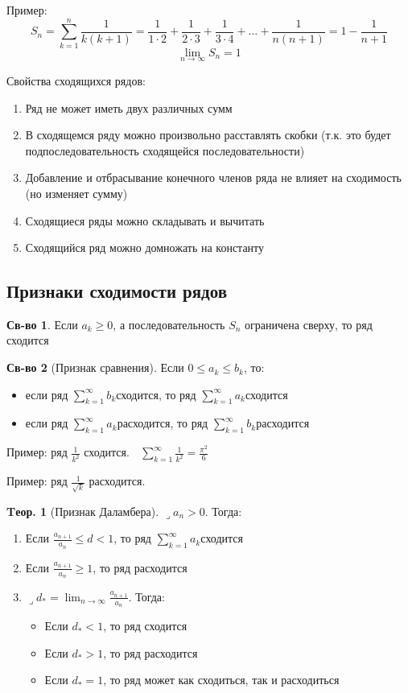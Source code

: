 \documentclass[a4paper,12pt]{article}
\numberwithin{figure}{section}
\theoremstyle{definition}
\newtheorem*{property}{Св-во}  %
\theoremstyle{definition}
\newtheorem{theorem}{Tеор.}[section]
\def\DS{\displaystyle}
\def\ntoinf{n\to\infty}
\def\leqs{\leqslant}
\def\geqs{\geqslant}
\def\lets{{\huge$\lrcorner$}\space}
\def\rowak{$\DS\sum_{k=1}^{\infty}a_k$\space}
\begin{document}
\bigbreak
Пример:
\[ S_n = \sum_{k=1}^n \frac1{k(k+1)}
       = \frac1{1\cdot2} + \frac1{2\cdot3} + \frac1{3\cdot4} + ... + \frac1{n(n+1)}
       = 1 - \frac1{n+1} \]
\[ \lim_{\ntoinf}S_n = 1 \]
\bigskip

Свойства сходящихся рядов:
\begin{enumerate}
	\item Ряд не может иметь двух различных сумм
	\item В сходящемся ряду можно произвольно расставлять скобки
		  (т.к. это будет подпоследовательность сходящейся последовательности)
	\item Добавление и отбрасывание конечного членов ряда не влияет на сходимость (но изменяет сумму)
	\item Сходящиеся ряды можно складывать и вычитать
	\item Сходящийся ряд можно домножать на константу
\end{enumerate}


\subsection{Признаки сходимости рядов}

\begin{property}
	Если $a_k\geqs0$, а последовательность $S_n$ ограничена сверху, то ряд сходится
\end{property}

\begin{property}[Признак сравнения]
	Если $0 \leqs a_k \leqs b_k$, то:
	\begin{itemize}
		\def\rowbk{$\DS\sum_{k=1}^{\infty}b_k$\space}
		\item если ряд \rowbk сходится, то ряд \rowak сходится
		\item если ряд \rowak расходится, то ряд \rowbk расходится
	\end{itemize}
\end{property}

Пример: ряд $\DS\frac1{k^2}$ сходится. $\;$
$\DS\sum_{k=1}^\infty \frac1{k^2} = \frac{\pi^2}6 $

\bigbreak
Пример: ряд $\DS\frac1{\sqrt{k}}$ расходится.

\begin{theorem}[Признак Даламбера]
  \lets $a_n > 0$. Тогда:
  \begin{enumerate}
	\item Если $\DS\frac{a_{n+1}}{a_n} \leqs d < 1$, то ряд \rowak сходится
	\item Если $\DS\frac{a_{n+1}}{a_n} \geqs 1$, то ряд расходится
	\item \lets $\DS d_* = \lim_{\ntoinf} \frac{a_{n+1}}{a_n}$. Тогда:
	  \begin{itemize}
	  	\item Если $d_* < 1$, то ряд сходится
	  	\item Если $d_* > 1$, то ряд расходится
	  	\item Если $d_* = 1$, то ряд может как сходиться, так и расходиться
	  \end{itemize}
  \end{enumerate}
\end{theorem}
\end{document}

